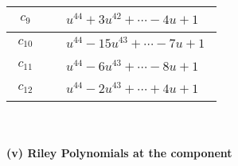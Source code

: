 \documentclass[1p]{elsarticle_modified}
\theoremstyle{definition}
\begin{document}
\begin{tabular}{m{50pt}|m{274pt}}
\hline $$\begin{aligned}c_{9}\end{aligned}$$&$\begin{aligned}
&u^{44}+3 u^{42}+\cdots-4 u+1
\end{aligned}$\\
\hline $$\begin{aligned}c_{10}\end{aligned}$$&$\begin{aligned}
&u^{44}-15 u^{43}+\cdots-7 u+1
\end{aligned}$\\
\hline $$\begin{aligned}c_{11}\end{aligned}$$&$\begin{aligned}
&u^{44}-6 u^{43}+\cdots-8 u+1
\end{aligned}$\\
\hline $$\begin{aligned}c_{12}\end{aligned}$$&$\begin{aligned}
&u^{44}-2 u^{43}+\cdots+4 u+1
\end{aligned}$\\
\hline
\end{tabular}\\~\\
\newpage\renewcommand{\arraystretch}{1}
\flushleft \textbf{(v) Riley Polynomials at the component}\newline \\
\end{document}
